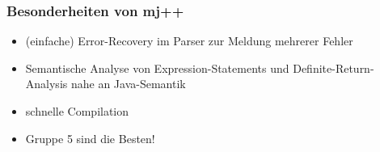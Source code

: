 \begin{frame}
    \frametitle{Besonderheiten von mj++}
    \begin{itemize}
        \item (einfache) Error-Recovery im Parser zur Meldung mehrerer Fehler
        \item Semantische Analyse von Expression-Statements und Definite-Return-Analysis nahe an Java-Semantik
        \item schnelle Compilation
            \pause
        \item Gruppe 5 sind die Besten!
    \end{itemize}
\end{frame}
